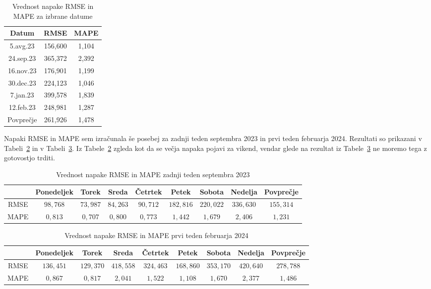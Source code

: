 \documentclass[a4paper, 11pt]{article}
\begin{document}
\begin{table}[!ht]
    \centering
    \caption{Vrednost napake RMSE in MAPE za izbrane datume}\par\medskip
    \label{Tab:RMSE_MAPE}
    \begin{tabular}{c|c|c}
        Datum & RMSE & MAPE \\ \hline
        5.avg.23 & 156,600 & 1,104 \\ 
        24.sep.23 & 365,372 & 2,392 \\ 
        16.nov.23 & 176,901 & 1,199 \\ 
        30.dec.23 & 224,123 & 1,046 \\ 
        7.jan.23 & 399,578 & 1,839 \\ 
        12.feb.23 & 248,981 & 1,287 \\ \hline
        Povprečje & 261,926 & 1,478 \\ 
    \end{tabular}
\end{table}


\noindent Napaki RMSE in MAPE sem izračunala še posebej za zadnji teden septembra 2023 in 
prvi teden februarja 2024. Rezultati so prikazani v Tabeli~\ref{Tab:RMSE_MAPE_sept}  in v Tabeli~\ref{Tab:RMSE_MAPE_feb}. 
Iz Tabele~\ref{Tab:RMSE_MAPE_sept} zgleda kot da se večja napaka pojavi za vikend, vendar glede na rezultat iz
Tabele~\ref{Tab:RMSE_MAPE_feb} ne moremo tega z gotovostjo trditi. 


\begin{table}[!ht]
    \centering
    \caption{Vrednost napake RMSE in MAPE zadnji teden septembra 2023}\par\medskip
    \label{Tab:RMSE_MAPE_sept}
    \begin{tabular}{c|c|c|c|c|c|c|c||c}
        ~ & Ponedeljek & Torek & Sreda & Četrtek & Petek & Sobota & Nedelja & Povprečje\\ \hline
        RMSE & $98{,}768$ & $73{,}987$ & $84{,}263$ & $90{,}712$ & $182{,}816$ & $220{,}022$ & $336{,}630$ & $155{,}314$ \\ 
        MAPE & $0{,}813$ & $0{,}707$ & $0{,}800$ & $0{,}773$ & $1{,}442$ & $1{,}679$ & $2{,}406$ & $1{,}231$\\ 
    \end{tabular}
\end{table}


\begin{table}[!ht]
    \centering
    \caption{Vrednost napake RMSE in MAPE prvi teden februarja 2024}\par\medskip
    \label{Tab:RMSE_MAPE_feb}
    \begin{tabular}{c|c|c|c|c|c|c|c||c}
        ~ & Ponedeljek & Torek & Sreda & Četrtek & Petek & Sobota & Nedelja & Povprečje\\ \hline
        RMSE & $136{,}451$ & $129{,}370$ & $418{,}558$ & $324{,}463$ & $168{,}860$ & $353{,}170$ & $420{,}640$ & $278{,}788$\\ 
        MAPE & $0{,}867$ & $0{,}817$ & $2{,}041$ & $1{,}522$ & $1{,}108$ & $1{,}670$ & $2{,}377$ & $1{,}486$\\ 
    \end{tabular}
\end{table} 
\end{document}
